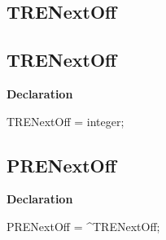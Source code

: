 \documentclass{report}
\newif\ifpdf
\begin{document}
\subsection*{\large{\textbf{TRENextOff}}\normalsize\hspace{1ex}\hrulefill}
\else
\subsection*{TRENextOff}
\fi
\label{RegExpr-TRENextOff}
\begin{list}{}{
\setlength{\itemindent}{0cm}
\setlength{\listparindent}{0cm}
\setlength{\leftmargin}{\evensidemargin}
\addtolength{\leftmargin}{\tmplength}
\settowidth{\labelsep}{X}
\addtolength{\leftmargin}{\labelsep}
\setlength{\labelwidth}{\tmplength}
}
\item[\textbf{Declaration}\hfill]
\ifpdf
\begin{flushleft}
\fi
\begin{ttfamily}
TRENextOff = integer;\end{ttfamily}

\ifpdf
\end{flushleft}
\fi

\end{list}
\ifpdf
\subsection*{\large{\textbf{PRENextOff}}\normalsize\hspace{1ex}\hrulefill}
\else
\subsection*{PRENextOff}
\fi
\label{RegExpr-PRENextOff}
\begin{list}{}{
\setlength{\itemindent}{0cm}
\setlength{\listparindent}{0cm}
\setlength{\leftmargin}{\evensidemargin}
\addtolength{\leftmargin}{\tmplength}
\settowidth{\labelsep}{X}
\addtolength{\leftmargin}{\labelsep}
\setlength{\labelwidth}{\tmplength}
}
\item[\textbf{Declaration}\hfill]
\ifpdf
\begin{flushleft}
\fi
\begin{ttfamily}
PRENextOff = {\^{}}TRENextOff;\end{ttfamily}

\ifpdf
\end{flushleft}
\fi

\end{list}
\ifpdf
\end{document}
